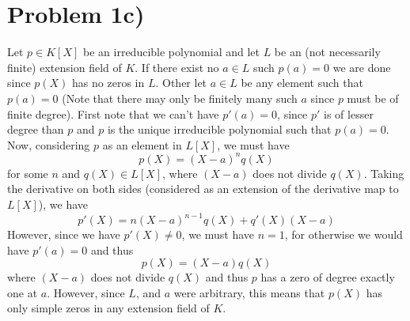 \section*{Problem 1c)}
Let $p\in K[X]$ be an irreducible polynomial and let $L$ be an (not necessarily finite) extension field of $K$. If there exist no $a\in L$ such $p(a)=0$ we are done since $p(X)$ has no zeros in $L$. Other let $a\in L$ be any element such that $p(a) = 0$ (Note that there may only be finitely many such $a$ since $p$ must be of finite degree). First note that we can't have $p'(a) = 0$, since $p'$ is of lesser degree than $p$ and $p$ is the unique irreducible polynomial such that $p(a)=0$. Now, considering $p$ as an element in $L[X]$, we must have 
\[ p(X) = (X-a)^n q(X) \]
for some $n$ and $q(X)\in L[X]$, where $(X-a)$ does not divide $q(X)$. Taking the derivative on both sides (considered as an extension of the derivative map to $L[X]$), we have
\[ p'(X) = n(X-a)^{n-1} q(X) + q'(X)(X-a) \]
However, since we have $p'(X) \neq 0$, we must have $n=1$, for otherwise we would have $p'(a)=0$ and thus 
\[ p(X) = (X-a) q(X) \]
where $(X-a)$ does not divide $q(X)$ and thus $p$ has a zero of degree exactly one at $a$. However, since $L$, and $a$ were arbitrary, this means that $p(X)$ has only simple zeros in any extension field of $K$.
